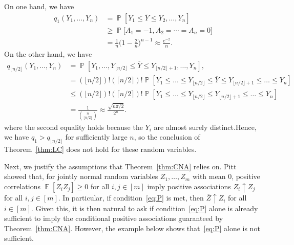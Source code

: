 \documentclass[12pt,english,reqno]{amsart}
\theoremstyle{plain}
\theoremstyle{remark}
\numberwithin{figure}{section}
\numberwithin{equation}{section}
\def\bY{\overline{Y}}
\def\bZ{\overline{Z}}
\DeclareMathOperator{\Eb}{\mathbb{E}} %
\DeclareMathOperator{\Pb}{\mathbb{P}} %
\def\aq{q} %
\begin{document}
On one hand, we have
\begin{align*}
	\aq_1(Y_1,\dots, Y_n) & = \Pb \left [ Y_1 \leq \bY \leq Y_{2}, \dots, Y_{n} \right]            \\
	                      & \geq \Pb\big[ A_1 =-1, A_2=\cdots=A_n=0 \big]                          \\
	                      & = \frac{1}{n} \big(1-\frac{2}{n} \big)^{n-1} \approx \frac{e^{-2}}{n}.
\end{align*}
On the other hand, we have
\begin{align*}
	\aq_{\lfloor n/2\rfloor}(Y_1,\dots, Y_n) & = \Pb \left [ Y_1,\dots, Y_{\lfloor n/2\rfloor} \leq \bY \leq Y_{\lfloor n/2\rfloor +1}, \dots, Y_{n} \right],                                                          \\
	                                         & =  (\lfloor n/2\rfloor)! (\lceil n/2\rceil)! \Pb\left[ Y_1 \leq \dots \leq Y_{\lfloor n/2\rfloor} \leq \bY \leq Y_{\lfloor n/2\rfloor +1} \leq \dots \leq Y_{n} \right] \\
	                                         & \leq (\lfloor n/2\rfloor)! (\lceil n/2\rceil)! \Pb\left[ Y_1 \leq \dots \leq Y_{\lfloor n/2\rfloor} \leq Y_{\lfloor n/2\rfloor +1} \leq \dots \leq Y_{n} \right]        \\
	                                         & = \frac{1}{\binom{n}{\lfloor n/2 \rfloor}} \approx \frac{\sqrt{n \pi/2}}{2^n}.
\end{align*}
where the second equality holds because the $Y_i$ are almost surely distinct.Hence, we have $\aq_1 > \aq_{\lfloor n/2\rfloor}$ for sufficiently large $n$, so the conclusion of Theorem~\ref{thm:LC} does not hold for these random variables.


Next, we justify the assumptions that Theorem~\ref{thm:CNA} relies on. Pitt~\cite{Pitt} showed that, for jointly normal random variables $Z_1,\dots, Z_m$ with mean $0$, positive correlations $\Eb[Z_i Z_j] \geq 0$ for all $i,j \in [m]$ imply positive associations $Z_i \uparrow Z_j$ for all $i,j \in [m]$. In particular, if condition~\ref{eq:P} is met, then $\bZ \uparrow Z_i$ for all $i\in [m]$. Given this, it is then natural to ask if condition~\ref{eq:P} alone is already sufficient to imply
the conditional positive associations guaranteed by Theorem~\ref{thm:CNA}. However, the example below shows that~\ref{eq:P} alone is not sufficient.
\end{document}
